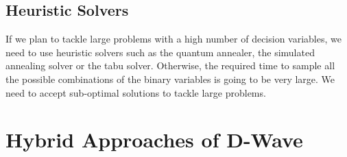 \subsection{Heuristic Solvers}
If we plan to tackle large problems with a high number of decision variables, we need to use heuristic solvers such as the quantum annealer, the simulated annealing solver or the tabu solver. Otherwise, the required time to sample all the possible combinations of the binary variables is going to be very large. We need to accept sub-optimal solutions to tackle large problems.
\section{Hybrid Approaches of D-Wave}
